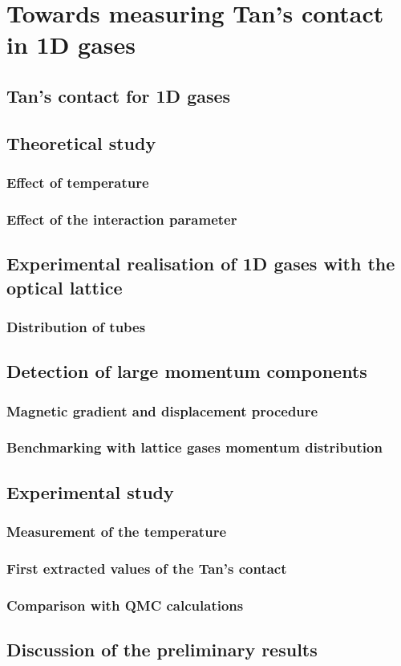 \chapter{Towards measuring Tan's contact in 1D gases}

\section{Tan's contact for 1D gases}

\section{Theoretical study}

\subsection{Effect of temperature}

\subsection{Effect of the interaction parameter}

\section{Experimental realisation of 1D gases with the optical lattice}

\subsection{Distribution of tubes}

\section{Detection of large momentum components}

\subsection{Magnetic gradient and displacement procedure}

\subsection{Benchmarking with lattice gases momentum distribution}

\section{Experimental study}

\subsection{Measurement of the temperature}

\subsection{First extracted values of the Tan's contact}

\subsection{Comparison with QMC calculations}

\section{Discussion of the preliminary results}